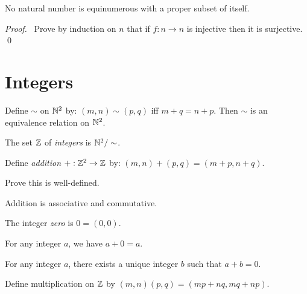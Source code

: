 \begin{theorem}
    No natural number is equinumerous with a proper subset of itself.
\end{theorem}

\begin{proof}
    \pf\ Prove by induction on $n$ that if $f : n \rightarrow n$ is injective
    then it is surjective. \qed
\end{proof}

\chapter{Integers}

\begin{lemma}
    Define $\sim$ on $\mathbb{N}^2$ by: $(m,n) \sim (p,q)$ iff $m + q = n + p$.
    Then $\sim$ is an equivalence relation on $\mathbb{N}^2$.
\end{lemma}

\begin{definition}[Integers]
    The set $\mathbb{Z}$ of \emph{integers} is $\mathbb{N}^2 / \sim$.
\end{definition}

\begin{definition}
    Define \emph{addition} $+ : \mathbb{Z}^2 \rightarrow \mathbb{Z}$ by: $(m,n) + (p,q) = (m+p,n+q)$.
    
    Prove this is well-defined.
\end{definition}

\begin{theorem}
    Addition is associative and commutative.
\end{theorem}

\begin{definition}[Zero]
    The integer \emph{zero} is $0 = (0,0)$.
\end{definition}

\begin{theorem}
    For any integer $a$, we have $a + 0 = a$.
\end{theorem}

\begin{theorem}
    For any integer $a$, there exists a unique integer $b$ such that $a + b = 0$.
\end{theorem}

\begin{definition}[Multiplication]
    Define multiplication on $\mathbb{Z}$ by $(m,n)(p,q) = (mp+nq,mq+np)$.
\end{definition}

